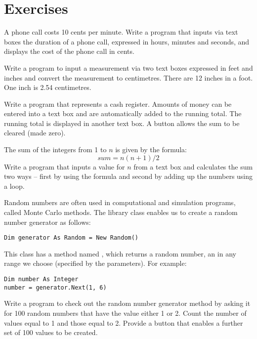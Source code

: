 	\section{Exercises}
		\begin{EXE}
			\item	{} A phone call costs 10 cents per minute. Write a program that inputs via text boxes the duration of a phone call, expressed in hours, minutes and seconds, and displays the cost of the phone call in cents.
			\item {} Write a program to input a measurement via two text boxes expressed in feet and inches and convert the measurement to centimetres.
			There are 12 inches in a foot. One inch is 2.54 centimetres.
			\item	{} Write a program that represents a cash register. Amounts of money can be entered into a text box and are automatically added to the running total. The running total is displayed in another text box. A button allows the sum to be cleared (made zero).
			\item	{} The sum of the integers from 1 to $n$ is given by the formula:
				\begin{equation*}
					sum = n(n + 1)/2
				\end{equation*}
				Write a program that inputs a value for $n$ from a text box and calculates the sum two ways – first by using the formula and second by adding up the numbers using a loop.
			\item	{} Random numbers are often used in computational and simulation programs, called Monte Carlo methods. The library class  enables us to create a random number generator as follows:
				\begin{lstlisting}
Dim generator As Random = New Random()
				\end{lstlisting}
				This class has a method named , which returns a random number, an  in any range we choose (specified by the parameters). For example:
				\begin{lstlisting}
Dim number As Integer
number = generator.Next(1, 6)
				\end{lstlisting}
				Write a program to check out the random number generator method by asking it for 100 random numbers that have the value either 1 or 2. Count the number of values equal to 1 and those equal to 2. Provide a button that enables a further set of 100 values to be created.

\end{EXE}
